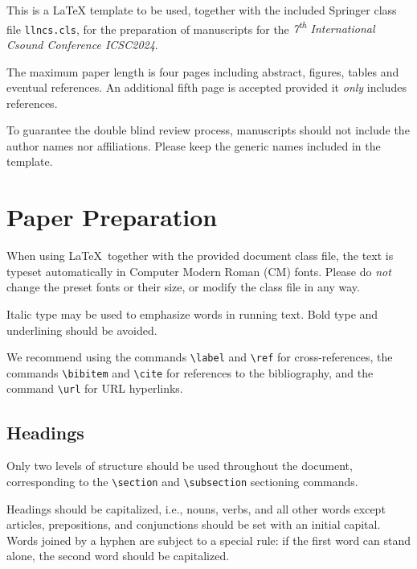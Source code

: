 \documentclass[runningheads,a4paper]{llncs}
\begin{document}
This is a \LaTeX{} template to be used, together with the included Springer
class file \texttt{llncs.cls}, for the preparation of manuscripts for the
\textit{7\textsuperscript{th} International Csound Conference
\textemdash{} ICSC2024}.

The maximum paper length is four pages including abstract, figures, tables
and eventual references. An additional fifth page is accepted provided it
\textit{only} includes references.

To guarantee the double blind review process, manuscripts should not include
the author names nor affiliations. Please keep the generic names included in the
template.

\section{Paper Preparation}

When using \LaTeX\ together with the provided document class file, the text
is typeset automatically in Computer Modern Roman (CM) fonts. Please do
\emph{not} change the preset fonts or their size, or modify the class file
in any way.

Italic type may be used to emphasize words in running text. Bold type and
underlining should be avoided.

We recommend using the commands \verb+\label+ and \verb+\ref+ for
cross-references, the commands \verb+\bibitem+ and \verb+\cite+ for
references to the bibliography, and the command \verb+\url+ for URL
hyperlinks.


\subsection{Headings}

Only two levels of structure should be used throughout the document,
corresponding to the \verb+\section+ and \verb+\subsection+ sectioning
commands.

Headings should be capitalized, i.e., nouns, verbs, and all other words
except articles, prepositions, and conjunctions should be set with an
initial capital. Words joined by a hyphen are subject to a special rule: if
the first word can stand alone, the second word should be capitalized.
\end{document}
